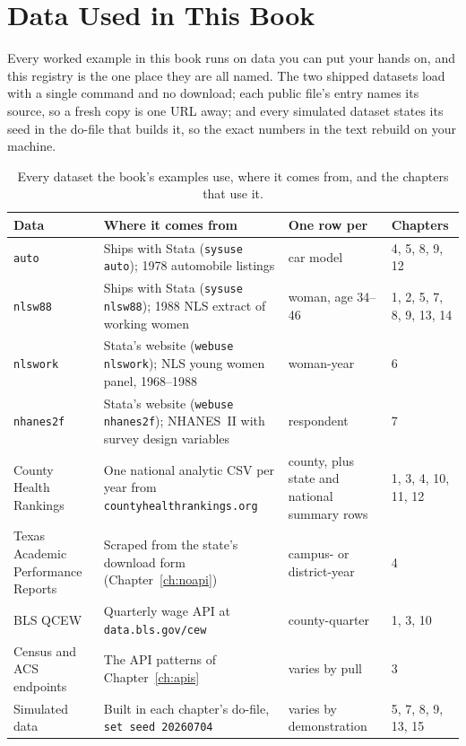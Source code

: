 \documentclass[
    a4paper,
    fontsize=10pt,
    twoside=true,
    numbers=noenddot,
]{kaobook}
\begin{document}
\backmatter
{}
\chapter{Data Used in This Book}\label{app:data}
Every worked example in this book runs on data you can put your hands on, and this registry is the one place they are all named. The two shipped datasets load with a single command and no download; each public file's entry names its source, so a fresh copy is one URL away; and every simulated dataset states its seed in the do-file that builds it, so the exact numbers in the text rebuild on your machine.

\begin{table}[htbp]
\centering
\footnotesize
\caption[Datasets used in this book]{Every dataset the book's examples use, where it comes from, and the chapters that use it.}
\label{tab:app-data}
\begin{tabular}{p{3.4cm}p{4.6cm}p{2.6cm}p{2.2cm}}
\hline
Data & Where it comes from & One row per & Chapters \\
\hline
\texttt{auto} & Ships with Stata (\texttt{sysuse auto}); 1978 automobile listings & car model & 4, 5, 8, 9, 12 \\
\texttt{nlsw88} & Ships with Stata (\texttt{sysuse nlsw88}); 1988 NLS extract of working women & woman, age 34--46 & 1, 2, 5, 7, 8, 9, 13, 14 \\
\texttt{nlswork} & Stata's website (\texttt{webuse nlswork}); NLS young women panel, 1968--1988 & woman-year & 6 \\
\texttt{nhanes2f} & Stata's website (\texttt{webuse nhanes2f}); NHANES~II with survey design variables & respondent & 7 \\
County Health Rankings & One national analytic CSV per year from \texttt{countyhealthrankings.org} & county, plus state and national summary rows & 1, 3, 4, 10, 11, 12 \\
Texas Academic Performance Reports & Scraped from the state's download form (Chapter~\ref{ch:noapi}) & campus- or district-year & 4 \\
BLS QCEW & Quarterly wage API at \texttt{data.bls.gov/cew} & county-quarter & 1, 3, 10 \\
Census and ACS endpoints & The API patterns of Chapter~\ref{ch:apis} & varies by pull & 3 \\
Simulated data & Built in each chapter's do-file, \texttt{set seed 20260704} & varies by demonstration & 5, 7, 8, 9, 13, 15 \\
\hline
\end{tabular}
\end{table}
\end{document}
